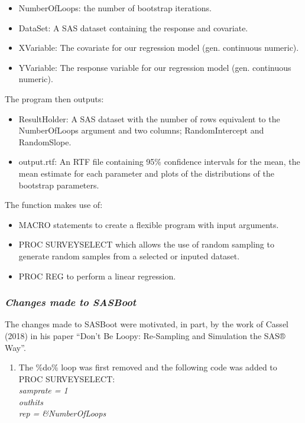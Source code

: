 \documentclass[]{article}
\providecommand{\tightlist}{%
  \setlength{\itemsep}{0pt}\setlength{\parskip}{0pt}}
\begin{document}
\begin{itemize}
\tightlist
\item
  NumberOfLoops: the number of bootstrap iterations.
\item
  DataSet: A SAS dataset containing the response and covariate.
\item
  XVariable: The covariate for our regression model (gen. continuous
  numeric).
\item
  YVariable: The response variable for our regression model (gen.
  continuous numeric).
\end{itemize}

The program then outputs:

\begin{itemize}
\tightlist
\item
  ResultHolder: A SAS dataset with the number of rows equivalent to the
  NumberOfLoops argument and two columns; RandomIntercept and
  RandomSlope.
\item
  output.rtf: An RTF file containing 95\% confidence intervals for the
  mean, the mean estimate for each parameter and plots of the
  distributions of the bootstrap parameters.
\end{itemize}

The function makes use of:

\begin{itemize}
\tightlist
\item
  MACRO statements to create a flexible program with input arguments.
\item
  PROC SURVEYSELECT which allows the use of random sampling to generate
  random samples from a selected or inputed dataset.
\item
  PROC REG to perform a linear regression.
\end{itemize}

\subsubsection{\texorpdfstring{\emph{Changes made to
SASBoot}}{Changes made to SASBoot}}\label{changes-made-to-sasboot}

The changes made to SASBoot were motivated, in part, by the work of
Cassel (2018) in his paper ``Don't Be Loopy: Re-Sampling and Simulation
the SAS® Way''.

\begin{enumerate}
\def\labelenumi{\arabic{enumi}.}
\tightlist
\item
  The \%do\% loop was first removed and the following code was added to
  PROC SURVEYSELECT:\\
  \emph{samprate = 1}\\
  \emph{outhits}\\
  \emph{rep = \&NumberOfLoops}
\end{enumerate}
\end{document}
